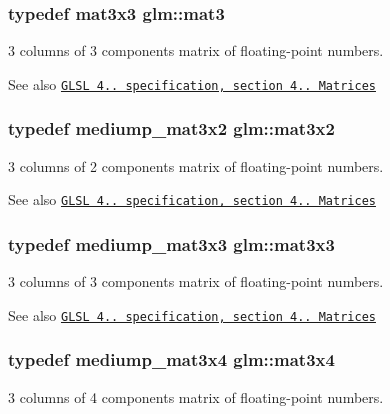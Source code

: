 \subsubsection[{mat3}]{\setlength{\rightskip}{0pt plus 5cm}typedef mat3x3 {\bf glm\+::mat3}}\label{group__core__types_gadfaff2a7dce5cbf4e77a47ecea42ac5b}
3 columns of 3 components matrix of floating-\/point numbers.

\begin{DoxySeeAlso}{See also}
\href{http://www.opengl.org/registry/doc/GLSLangSpec.4.20.8.pdf}{\tt G\+L\+S\+L 4.. specification, section 4.. Matrices} 
\end{DoxySeeAlso}
\hypertarget{group__core__types_gae38fe62de819d214ac89f1f4df343844}{}
\subsubsection[{mat3x2}]{\setlength{\rightskip}{0pt plus 5cm}typedef mediump\+\_\+mat3x2 {\bf glm\+::mat3x2}}\label{group__core__types_gae38fe62de819d214ac89f1f4df343844}
3 columns of 2 components matrix of floating-\/point numbers.

\begin{DoxySeeAlso}{See also}
\href{http://www.opengl.org/registry/doc/GLSLangSpec.4.20.8.pdf}{\tt G\+L\+S\+L 4.. specification, section 4.. Matrices} 
\end{DoxySeeAlso}
\hypertarget{group__core__types_gae01cfe70eb34df727346f82c7c08acd7}{}
\subsubsection[{mat3x3}]{\setlength{\rightskip}{0pt plus 5cm}typedef mediump\+\_\+mat3x3 {\bf glm\+::mat3x3}}\label{group__core__types_gae01cfe70eb34df727346f82c7c08acd7}
3 columns of 3 components matrix of floating-\/point numbers.

\begin{DoxySeeAlso}{See also}
\href{http://www.opengl.org/registry/doc/GLSLangSpec.4.20.8.pdf}{\tt G\+L\+S\+L 4.. specification, section 4.. Matrices} 
\end{DoxySeeAlso}
\hypertarget{group__core__types_ga75499a515649f0db9593beb23ab084a5}{}
\subsubsection[{mat3x4}]{\setlength{\rightskip}{0pt plus 5cm}typedef mediump\+\_\+mat3x4 {\bf glm\+::mat3x4}}\label{group__core__types_ga75499a515649f0db9593beb23ab084a5}
3 columns of 4 components matrix of floating-\/point numbers.

